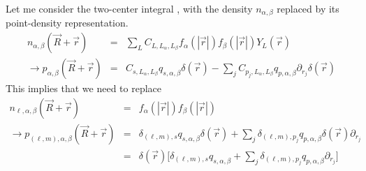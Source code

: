 \documentclass[11pt,a4paper]{report}
\begin{document}
Let me consider the two-center integral ,
with the density $n_{\alpha,\beta}$ replaced by its point-density
representation.
\begin{eqnarray}
n_{\alpha,\beta}(\vec{R}+\vec{r})
&=&\sum_{L}C_{L,L_\alpha,L_\beta}f_\alpha(|\vec{r}|)f_\beta(|\vec{r}|)Y_L(\vec{r})
\nonumber\\
\rightarrow 
p_{\alpha,\beta}(\vec{R}+\vec{r})&=&
C_{s,L_\alpha,L_\beta}q_{s,\alpha,\beta}\delta(\vec{r})
-
\sum_jC_{p_j,L_\alpha,L_\beta}q_{p,\alpha,\beta}\partial_{r_j}\delta(\vec{r})
\end{eqnarray}
This implies that we need to replace 
\begin{eqnarray}
n_{\ell,\alpha,\beta}(\vec{R}+\vec{r})
&=&f_\alpha(|\vec{r}|)f_\beta(|\vec{r}|)
\nonumber\\
\rightarrow 
p_{(\ell,m),\alpha,\beta}(\vec{R}+\vec{r})
&=&
\delta_{(\ell,m),s} q_{s,\alpha,\beta}\delta(\vec{r})
+
\sum_j\delta_{(\ell,m),p_j}q_{p,\alpha,\beta}\delta(\vec{r})\partial_{r_j}
\nonumber\\
&=&
\delta(\vec{r})\biggl[
\delta_{(\ell,m),s} q_{s,\alpha,\beta}
+
\sum_j\delta_{(\ell,m),p_j}q_{p,\alpha,\beta}\partial_{r_j}\biggr]
\end{eqnarray}
\end{document}
